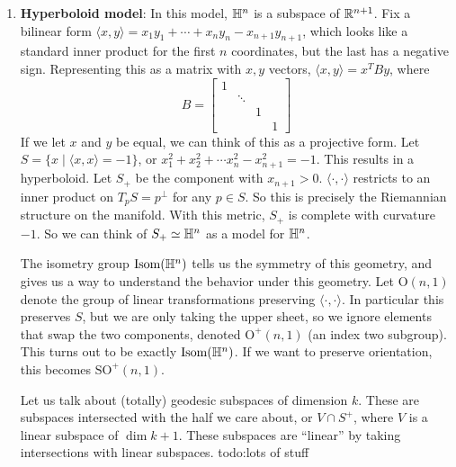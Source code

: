 \begin{enumerate}[label=(\arabic*)]
\setlength\itemsep{-.2em}
    \item \textbf{Hyperboloid model}: In this model, $\mathbb{H}^{n}$ is a subspace of $\mathbb{R}^{n+1}$. Fix a bilinear form $\langle x,y \rangle =x_1y_1+ \cdots +x_n y_n -x_{n+1}y_{n+1}$, which looks like a standard inner product for the first $n$ coordinates, but the last has a negative sign. Representing this as a matrix with $x,y$ vectors, $\langle x,y \rangle =x^T By$, where \[
    B=
    \begin{bmatrix}
        1 & & & \\
         & \ddots & & \\
         & & 1 & \\
         & & & 1
    \end{bmatrix}
    \] If we let $x$ and $y$ be equal, we can think of this as a projective form. Let $S = \{x \mid \langle x,x \rangle =-1\} $, or $x_1^2+x_2^2+\cdots x_n ^2-x_{n+1}^2=-1$. This results in a hyperboloid. Let $S_+$ be the component with $x_{n+1}>0$. $\langle \cdot ,\cdot  \rangle $ restricts to an inner product on $T_pS=p^{\perp}$ for any $p \in S$. So this is precisely the Riemannian structure on the manifold. With this metric, $S_+$ is complete with curvature $-1$. So we can think of $S_+ \simeq \mathbb{H}^n $ as a model for $\mathbb{H}^n $.

    The isometry group $\mathrm{Isom}(\mathbb{H}^n )$ tells us the symmetry of this geometry, and gives us a way to understand the behavior under this geometry. Let $\mathrm O(n,1)$ denote the group of linear transformations preserving $\langle \cdot ,\cdot  \rangle $. In particular this preserves $S$, but we are only taking the upper sheet, so we ignore elements that swap the two components, denoted $\mathrm O^+(n,1)$ (an index two subgroup). This turns out to be exactly $\mathrm{Isom}(\mathbb{H}^n )$. If we want to preserve orientation, this becomes $\mathrm{SO}^+(n,1)$.

    Let us talk about (totally) geodesic subspaces of dimension $k$. These are subspaces intersected with the half we care about, or $V \cap S^+$, where $V$ is a linear subspace of $\dim k+1$. These subspaces are ``linear'' by taking intersections with linear subspaces. {\color{red}todo:lots of stuff} 


\end{enumerate}
